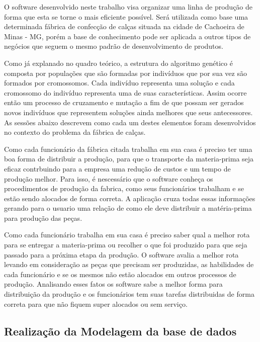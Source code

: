 \par O software desenvolvido neste trabalho visa organizar uma linha de produção
de forma que esta se torne o mais eficiente possível. Será utilizada como
base uma determinada fábrica de confecção de calças situada na cidade de
Cachoeira de Minas - MG, porém a base de conhecimento pode ser aplicada a outros
tipos de negócios que seguem o mesmo padrão de desenvolvimento de produtos.

\par Como já explanado no quadro teórico, a estrutura do algoritmo genético é composta
por populações que são formadas por indivíduos que por sua vez são formados por cromossomos.
Cada indivíduo representa uma solução e cada cromossomo do indivíduo representa uma de suas características. 
Assim ocorre então um processo de cruzamento e mutação a fim de que possam ser gerados novos 
indivíduos que representem soluções ainda melhores que seus antecessores.
As sessões abaixo descrevem como cada um destes elementos foram desenvolvidos no contexto do problema da fábrica de calças.

\par Como cada funcionário da fábrica citada trabalha em sua casa é preciso ter
uma boa forma de distribuir a produção, para que o transporte da materia-prima
seja eficaz contrbuindo para a empresa uma redução de custos e um tempo de
produção melhor.
Para isso, é nescessário que o software conheça os procedimentos de
produção da fabrica, como seus funcionários trabalham e se estão sendo alocados
de forma correta. A aplicação cruza todas essas informações gerando para o
usuario uma relação de como ele deve distribuir a matéria-prima para produção
das peças.

\par Como cada funcionário trabalha em sua casa é preciso saber qual a
melhor rota para se entregar a materia-prima ou recolher o que foi produzido
para que seja passado para a próxima etapa da produção. O software avalia a
melhor rota levando em consideração as peças que precisam ser produzidas, as
habilidades de cada funcionário e se os mesmos não estão alocados em outros
processos de produção. Analisando esses fatos os software sabe a melhor forma
para distribuição da produção e os funcionários tem
suas tarefas distribuidas de forma correta para que não fiquem super alocados ou
sem serviço.


\subsection{Realização da Modelagem da base de dados}

